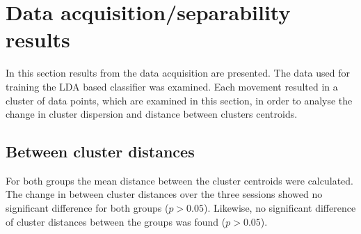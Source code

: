 \section{Data acquisition/separability results}
In this section results from the data acquisition are presented. The data used for training the LDA based classifier was examined. Each movement resulted in a cluster of data points, which are examined in this section, in order to analyse the change in cluster dispersion and distance between clusters centroids.


\subsection{Between cluster distances}
For both groups the mean distance between the cluster centroids were calculated. The change in between cluster distances over the three sessions showed no significant difference for both groups ($p > 0.05$). Likewise, no significant difference of cluster distances between the groups was found ($p > 0.05$).\\


